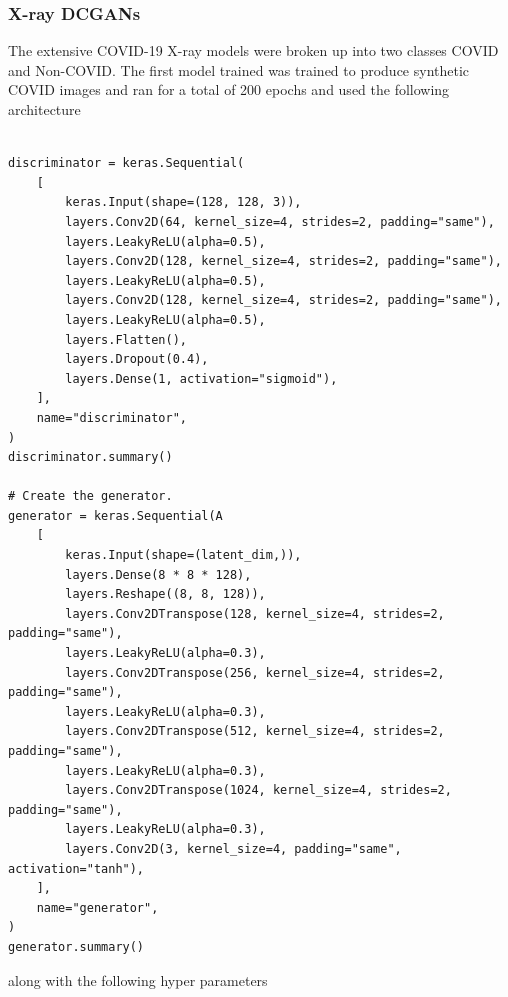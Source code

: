 \subsubsection{X-ray DCGANs}
The extensive COVID-19 X-ray models were broken up into two classes COVID and Non-COVID.  The first model trained was trained to produce synthetic COVID images and ran for a total of 200 epochs and used the following architecture
\begin{verbatim}

discriminator = keras.Sequential(
    [
        keras.Input(shape=(128, 128, 3)),
        layers.Conv2D(64, kernel_size=4, strides=2, padding="same"),
        layers.LeakyReLU(alpha=0.5),
        layers.Conv2D(128, kernel_size=4, strides=2, padding="same"),
        layers.LeakyReLU(alpha=0.5),
        layers.Conv2D(128, kernel_size=4, strides=2, padding="same"),
        layers.LeakyReLU(alpha=0.5),
        layers.Flatten(),
        layers.Dropout(0.4),
        layers.Dense(1, activation="sigmoid"),
    ],
    name="discriminator",
)
discriminator.summary()

# Create the generator.
generator = keras.Sequential(A
    [
        keras.Input(shape=(latent_dim,)),
        layers.Dense(8 * 8 * 128),
        layers.Reshape((8, 8, 128)),
        layers.Conv2DTranspose(128, kernel_size=4, strides=2, padding="same"),
        layers.LeakyReLU(alpha=0.3),
        layers.Conv2DTranspose(256, kernel_size=4, strides=2, padding="same"),
        layers.LeakyReLU(alpha=0.3),
        layers.Conv2DTranspose(512, kernel_size=4, strides=2, padding="same"),
        layers.LeakyReLU(alpha=0.3),
        layers.Conv2DTranspose(1024, kernel_size=4, strides=2, padding="same"),
        layers.LeakyReLU(alpha=0.3),
        layers.Conv2D(3, kernel_size=4, padding="same", activation="tanh"),
    ],
    name="generator",
)
generator.summary()
\end{verbatim}
along with the following hyper parameters
\begin{table}[H]
    \centering
    \caption{DCGAN for Producing Synthetic X-ray COVID Class Data for Extensive COVID 19 Dataset}
    \label{tab:DCGAN for Producing Synthetic X-ray COVID Class Data for Extensive COVID 19 Dataset}
\end{table}
